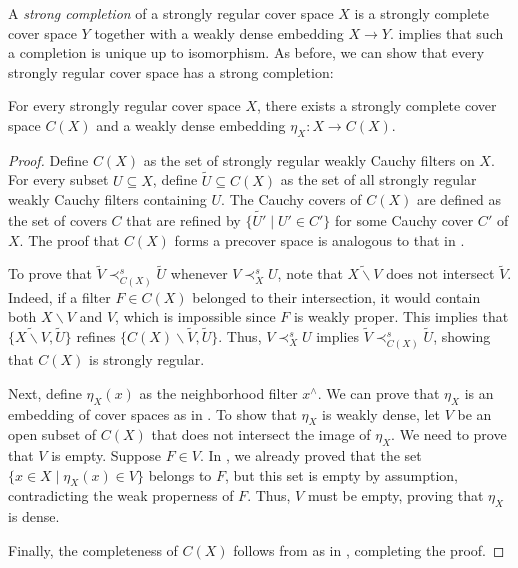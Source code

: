 \documentclass[pdflatex,sn-mathphys-num]{sn-jnl}
\theoremstyle{definition}
\theoremstyle{remark}
\numberwithin{figure}{section}
\newcommand{\rb}{\prec}
\begin{document}
A \emph{strong completion} of a strongly regular cover space $X$ is a strongly complete cover space $Y$ together with a weakly dense embedding $X \to Y$.
 implies that such a completion is unique up to isomorphism.
As before, we can show that every strongly regular cover space has a strong completion:

\begin{thm}
For every strongly regular cover space $X$, there exists a strongly complete cover space $C(X)$ and a weakly dense embedding $\eta_X : X \to C(X)$.
\end{thm}
\begin{proof}
Define $C(X)$ as the set of strongly regular weakly Cauchy filters on $X$.
For every subset $U \subseteq X$, define $\widetilde{U} \subseteq C(X)$ as the set of all strongly regular weakly Cauchy filters containing $U$.
The Cauchy covers of $C(X)$ are defined as the set of covers $C$ that are refined by $\{ \widetilde{U'} \mid U' \in C' \}$ for some Cauchy cover $C'$ of $X$.
The proof that $C(X)$ forms a precover space is analogous to that in .

To prove that $\widetilde{V} \rb^s_{C(X)} \widetilde{U}$ whenever $V \rb^s_X U$, note that $\widetilde{X \backslash V}$ does not intersect $\widetilde{V}$.
Indeed, if a filter $F \in C(X)$ belonged to their intersection, it would contain both $X \backslash V$ and $V$, which is impossible since $F$ is weakly proper.
This implies that $\{ \widetilde{X \backslash V}, \widetilde{U} \}$ refines $\{ C(X) \backslash \widetilde{V}, \widetilde{U} \}$.
Thus, $V \rb^s_X U$ implies $\widetilde{V} \rb^s_{C(X)} \widetilde{U}$, showing that $C(X)$ is strongly regular.

Next, define $\eta_X(x)$ as the neighborhood filter $x^\wedge$.
We can prove that $\eta_X$ is an embedding of cover spaces as in .
To show that $\eta_X$ is weakly dense, let $V$ be an open subset of $C(X)$ that does not intersect the image of $\eta_X$.
We need to prove that $V$ is empty.
Suppose $F \in V$.
In , we already proved that the set $\{ x \in X \mid \eta_X(x) \in V \}$ belongs to $F$, but this set is empty by assumption, contradicting the weak properness of $F$.
Thus, $V$ must be empty, proving that $\eta_X$ is dense.

Finally, the completeness of $C(X)$ follows from  as in , completing the proof.
\end{proof}
\end{document}

